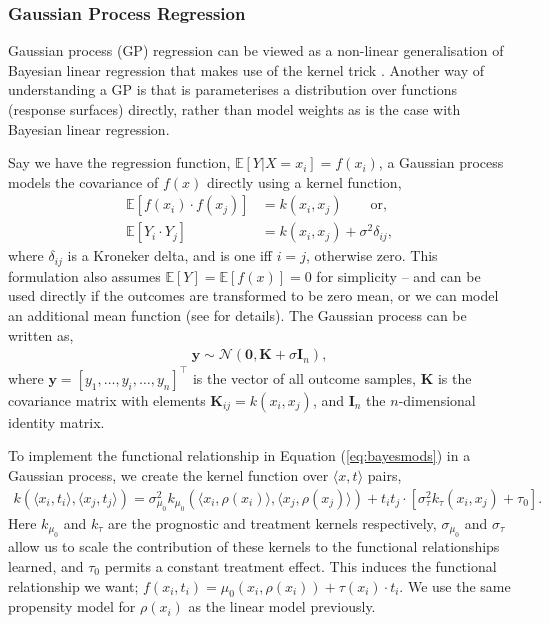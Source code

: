 \documentclass[12pt, a4paper]{article}
\begin{document}
\subsubsection*{Gaussian Process Regression}

Gaussian process (GP) regression can be viewed as a non-linear generalisation
of Bayesian linear regression that makes use of the kernel trick
\citep{williams2006, bishop2006}. Another way of understanding a GP is that is
parameterises a distribution over functions (response surfaces) directly,
rather than model weights as is the case with Bayesian linear regression.

Say we have the regression function, $\mathbb{E}[Y|X{=}x_i] = f(x_i)$, a
Gaussian process models the covariance of $f(x)$ directly using a kernel 
function,
\begin{align*}
  \mathbb{E}[f(x_i) \cdot f(x_j)] &= k(x_i, x_j) \qquad \textrm{or}, \\
  \mathbb{E}[Y_i \cdot Y_j] &= k(x_i, x_j) + \sigma^2 \delta_{ij},
\end{align*}
where $\delta_{ij}$ is a Kroneker delta, and is one iff $i=j$, otherwise zero.
This formulation also assumes $\mathbb{E}[Y] = \mathbb{E}[f(x)] = 0$ for 
simplicity -- and can be used directly if the outcomes are transformed to be
zero mean, or we can model an additional mean function (see \citet{williams2006}
for details). The Gaussian process can be written as,
\begin{align*}
  \mathbf{y} \sim \mathcal{N}(\mathbf{0}, \mathbf{K} + \sigma \mathbf{I}_n),
\end{align*}
where $\mathbf{y} = [y_1, \ldots, y_i, \ldots, y_n]^\top$ is the vector of all
outcome samples, $\mathbf{K}$ is the covariance matrix with elements
$\mathbf{K}_{ij} = k(x_i, x_j)$, and $\mathbf{I}_n$ the $n$-dimensional
identity matrix. 

To implement the functional relationship in Equation (\ref{eq:bayesmods}) in a
Gaussian process, we create the kernel function over $\langle x, t \rangle$
pairs,
\begin{align*}
  k(\langle x_i, t_i \rangle, \langle x_j, t_j \rangle) 
    = \sigma^2_{\mu_0} 
      k_{\mu_0}(\langle x_i, \rho(x_i) \rangle, \langle x_j, \rho(x_j) \rangle) 
    + t_i t_j \cdot [\sigma^2_\tau k_\tau(x_i, x_j) + \tau_0].
\end{align*}
Here $k_{\mu_0}$ and $k_\tau$ are the prognostic and treatment kernels
respectively, $\sigma_{\mu_0}$ and $\sigma_\tau$ allow us to scale the
contribution of these kernels to the functional relationships learned, and
$\tau_0$ permits a constant treatment effect. This induces the functional
relationship we want; $f(x_i, t_i) = \mu_0(x_i, \rho(x_i)) + \tau(x_i) \cdot
t_i$. We use the same propensity model for $\rho(x_i)$ as the linear model 
previously.
\end{document}
